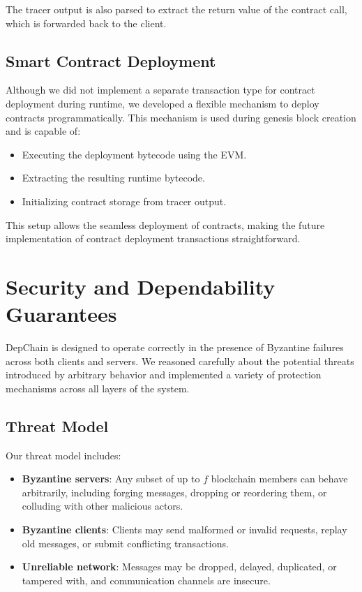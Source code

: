 \documentclass[runningheads]{llncs}
\begin{document}
The tracer output is also parsed to extract the return value of the contract call, which is forwarded back to the client.

\subsection{Smart Contract Deployment}

Although we did not implement a separate transaction type for contract deployment during runtime, we developed a flexible mechanism to deploy contracts programmatically. This mechanism is used during genesis block creation and is capable of:
\begin{itemize}
    \item Executing the deployment bytecode using the EVM.
    \item Extracting the resulting runtime bytecode.
    \item Initializing contract storage from tracer output.
\end{itemize}

This setup allows the seamless deployment of contracts, making the future implementation of contract deployment transactions straightforward.

\section{Security and Dependability Guarantees}

DepChain is designed to operate correctly in the presence of Byzantine failures across both clients and servers. We reasoned carefully about the potential threats introduced by arbitrary behavior and implemented a variety of protection mechanisms across all layers of the system.

\subsection{Threat Model}

Our threat model includes:
\begin{itemize}
    \item \textbf{Byzantine servers}: Any subset of up to $f$ blockchain members can behave arbitrarily, including forging messages, dropping or reordering them, or colluding with other malicious actors.
    \item \textbf{Byzantine clients}: Clients may send malformed or invalid requests, replay old messages, or submit conflicting transactions.
    \item \textbf{Unreliable network}: Messages may be dropped, delayed, duplicated, or tampered with, and communication channels are insecure.
\end{itemize}
\end{document}
